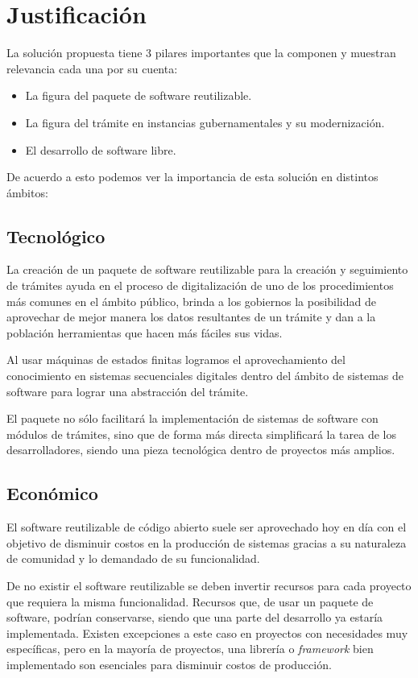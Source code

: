 \section{Justificación}
La solución propuesta tiene 3 pilares importantes que la componen y muestran relevancia cada una por su cuenta:

\begin{itemize}
    \item La figura del paquete de software reutilizable.
    \item La figura del trámite en instancias gubernamentales y su modernización.
    \item El desarrollo de software libre.
\end{itemize}

De acuerdo a esto podemos ver la importancia de esta solución en distintos ámbitos:

\subsection{Tecnológico}
La creación de un paquete de software reutilizable para la creación y
seguimiento de trámites ayuda en el proceso de digitalización de uno de los
procedimientos más comunes en el ámbito público, brinda a los gobiernos la
posibilidad de aprovechar de mejor manera los datos resultantes de un trámite y
dan a la población herramientas que hacen más fáciles sus vidas.

Al usar máquinas de estados finitas logramos el aprovechamiento del conocimiento
en sistemas secuenciales digitales dentro del ámbito de sistemas de software
para lograr una abstracción del trámite.

El paquete no sólo facilitará la implementación de sistemas de software con
módulos de trámites, sino que de forma más directa simplificará la tarea de los
desarrolladores, siendo una pieza tecnológica dentro de proyectos más amplios.

\subsection{Económico}
El software reutilizable de código abierto suele ser aprovechado hoy en día con el objetivo de
disminuir costos en la producción de sistemas gracias a su naturaleza de
comunidad y lo demandado de su funcionalidad.

De no existir el software reutilizable se deben invertir recursos para cada
proyecto que requiera la misma funcionalidad. Recursos que, de usar un paquete
de software, podrían conservarse, siendo que una parte del desarrollo ya estaría
implementada. Existen excepciones a este caso en proyectos con necesidades muy
específicas, pero en la mayoría de proyectos, una librería o \textit{framework} bien
implementado son esenciales para disminuir costos de producción.

